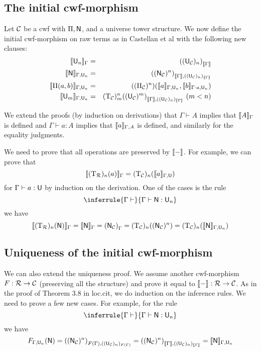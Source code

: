 \documentclass{lmcs}
\newcommand{\Ta}{\mathrm{T}}
\newcommand{\Ru}{\mathcal{R}}
\newcommand{\Un}{\U_n}
\newcommand{\TRu}{\Ta_\Ru}
\newcommand{\PiRu}{\Pi_\Ru}
\newcommand{\TC}{\Ta_\C}
\newcommand{\UC}{\U_\C}
\newcommand{\NC}{\N_\C}
\newcommand{\PiC}{\Pi_\C}
\begin{document}
\subsection{The initial cwf-morphism}

Let ${\mathcal C}$ be a cwf with $\Pi, \mathsf{N}$, and a universe tower structure. We now define the initial cwf-morphism on raw terms as in Castellan et al with the following new clauses:
\begin{eqnarray*}
\inte{\Un}_\Gamma &=& {({({\UC})_n})}_{\inte{\Gamma}}\\
\inte{\N}_{\Gamma,\Un} &=&  {({({\NC})^n})}_{\inte{\Gamma},((\UC)_n)_{\inte{\Gamma}}}\\
\inte{\Pi(a,b)}_{\Gamma,\Un} &=& {({({\PiC})^n})}(\inte{a}_{\Gamma,\Un},\inte{b}_{\Gamma \cdot a,\Un})\\
\inte{\U_m}_{\Gamma,\U_{n}} &=& 
(\TC)^n_m{({({\UC})^m})}_{\inte{\Gamma},((\UC)_{n})_{\inte{\Gamma}}}\ (m < n)
\end{eqnarray*}

We extend the proofs (by induction on derivations) that $\Gamma \vdash A$ implies that $\llbracket A \rrbracket_\Gamma$ is defined and $\Gamma \vdash a : A$ implies that $\llbracket a \rrbracket_{\Gamma,A}$ is defined, and similarly for the equality judgments. 

We need to prove that all operations are preserved by $\llbracket - \rrbracket$. For example, we can prove that 
$$
\inte{(\TRu)_n(a)}_\Gamma = (\TC)_n(\inte{a}_{\Gamma,\U})
$$
for $\Gamma \vdash a : \mathsf{U}$ by induction on the derivation.
One of the cases is the rule
$$
\inferrule
		{\Gamma \vdash} 
		{\Gamma \vdash \N : \Un}
$$
we have
$$
\inte{(\Ta_\Ru)_n(\N)}_\Gamma = \inte{\N}_\Gamma = {(\N_\C)}_\Gamma = (\Ta_\C)_n((\NC)^n) = (\Ta_\C)_n(\inte{\N}_{\Gamma,\Un})
$$

\subsection{Uniqueness of the initial cwf-morphism}

We can also extend the uniqueness proof. We assume another cwf-morphism $F : \Ru \to \C$ (preserving all the structure) and prove it equal to $\inte{-} : \Ru \to \C$. As in the proof of Theorem 3.8 in loc.cit, we do induction on the inference rules. We need to prove a few new cases. For example, for the rule
$$
\inferrule
		{\Gamma \vdash} 
		{\Gamma \vdash \N : \Un}
$$
we have
$$
F_{\Gamma,\Un}(\N) =  {({({\NC})^n})}_{F(\Gamma),((\UC)_n)_{F(\Gamma)}} =  {({({\NC})^n})}_{\inte{\Gamma},((\UC)_n)_{\inte{\Gamma}}} = \inte{\N}_{\Gamma,\Un}
$$
\end{document}
